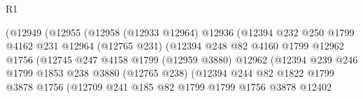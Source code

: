 \begin{lexlean}{R1}
\begin{coremodule}
                                  (@12949
                                    (@12955
                                      (@12958
                                        (@12933 @12964)
                                        @12936
                                        (@12394
                                          @232
                                          @250
                                          @1799
                                          @4162
                                          @231
                                          @12964
                                          (@12765 @231)
                                          (@12394
                                            @248
                                            @82
                                            @4160
                                            @1799
                                            @12962
                                            @1756
                                            (@12745
                                              @247
                                              @4158
                                              @1799
                                              (@12959 @3880)
                                              @12962
                                              (@12394
                                                @239
                                                @246
                                                @1799
                                                @1853
                                                @238
                                                @3880
                                                (@12765 @238)
                                                (@12394
                                                  @244
                                                  @82
                                                  @1822
                                                  @1799
                                                  @3878
                                                  @1756
                                                  (@12709
                                                    @241
                                                    @185
                                                    @82
                                                    @1799
                                                    @1799
                                                    @1756
                                                    @3878
                                                    @12402

\end{coremodule}
\end{lexlean}
